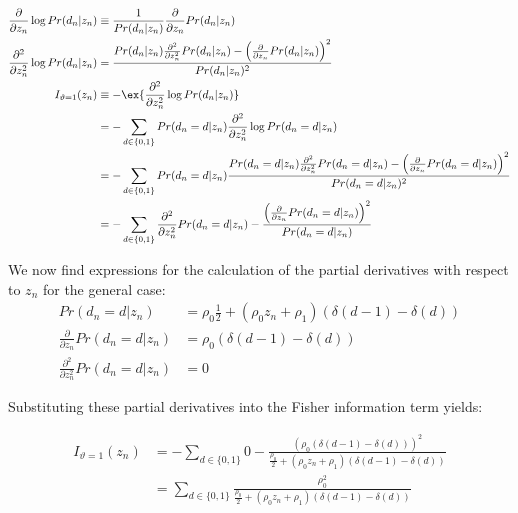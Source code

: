 \begin{align}
\frac{\partial}{\partial z_n} \log Pr(d_n|z_n) & \equiv \frac{1}{Pr(d_n|z_n)}  \frac{\partial}{\partial z_n} Pr(d_n|z_n) \\ 
\frac{\partial^2}{\partial z_n^2} \log Pr(d_n|z_n) & = \frac{Pr(d_n|z_n)  \frac{\partial^2}{\partial z_n^2}Pr(d_n|z_n) - \left(  \frac{\partial}{\partial z_n} Pr(d_n|z_n) \right)^2 }{Pr(d_n|z_n)^2} \\
I_{\vartheta=1}(z_n) & \equiv - \ex{\frac{\partial^2}{\partial z_n^2} \log Pr(d_n|z_n)} \\
& = - \sum_{d\in \{0, 1\}}  Pr(d_n=d|z_n)  \frac{\partial^2}{\partial z_n^2} \log Pr(d_n=d|z_n) \\
& = - \sum_{d\in \{0, 1\}}  Pr(d_n=d|z_n)  \frac{Pr(d_n=d|z_n)  \frac{\partial^2}{\partial z_n^2}Pr(d_n=d|z_n) - \left(  \frac{\partial}{\partial z_n} Pr(d_n=d|z_n) \right)^2 }{Pr(d_n=d|z_n)^2}\\
& = - \sum_{d\in \{0, 1\}}  \frac{\partial^2}{\partial z_n^2}Pr(d_n=d|z_n) - \frac{\left(  \frac{\partial}{\partial z_n} Pr(d_n=d|z_n) \right)^2 }{Pr(d_n=d|z_n)}
\end{align}

We now find expressions for the calculation of the partial derivatives with respect to $z_n$ for the general case: 
\begin{align}
Pr(d_n=d|z_n) 
& = \rho_0 \frac{1}{2} + (\rho_0 z_n + \rho_1)\left( \delta(d-1) - \delta(d) \right) \\
\frac{\partial}{\partial z_n} Pr(d_n=d|z_n) & = \rho_0 \left( \delta(d-1) - \delta(d) \right)\\
\frac{\partial^2}{\partial z_n^2}Pr(d_n=d|z_n) & = 0
\end{align}

Substituting these partial derivatives into the Fisher information term yields:

\begin{align}
I_{\vartheta=1}(z_n)  & = - \sum_{d\in \{0, 1\}}  0 - \frac{\left( \rho_0 \left( \delta(d-1) - \delta(d) \right) \right)^2 }{ \frac{\rho_0}{2} + (\rho_0 z_n + \rho_1)\left( \delta(d-1) - \delta(d) \right)} \\
& = \sum_{d\in \{0, 1\}} \frac{\rho_0^2}{ \frac{\rho_0}{2} + (\rho_0 z_n + \rho_1)\left( \delta(d-1) - \delta(d) \right)} \label{eqn:app:applied_fisherinfo:0}
\end{align}

